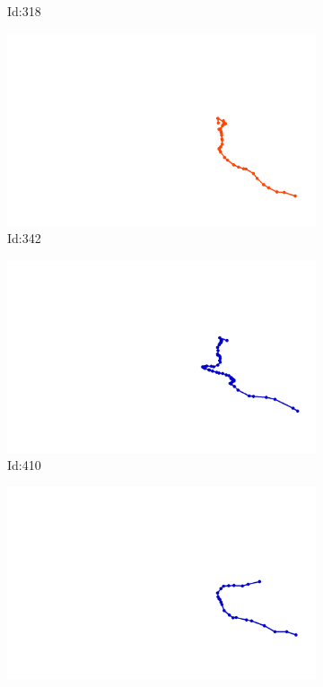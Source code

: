 \documentclass[12pt,twoside]{report}
\begin{document}
\begin{figure}
\begin{subfigure}[b]{0.20\textwidth}
\caption{Id:318}
\end{subfigure}
\begin{subfigure}[b]{0.20\textwidth}
\centering
\includegraphics[width=\textwidth]{../trajectories/342.png}
\caption{Id:342}
\end{subfigure}
\begin{subfigure}[b]{0.20\textwidth}
\centering
\includegraphics[width=\textwidth]{../trajectories/410.png}
\caption{Id:410}
\end{subfigure}
\begin{subfigure}[b]{0.20\textwidth}
\centering
\includegraphics[width=\textwidth]{../trajectories/473.png}

\end{subfigure}
\end{figure}
\end{document}

